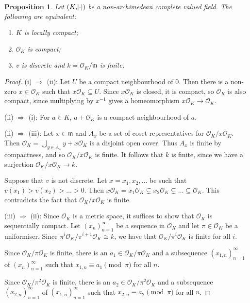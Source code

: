 \documentclass[11pt]{article}
\theoremstyle{definition}
\theoremstyle{plain}
\newtheorem{proposition}[definition]{Proposition}
\theoremstyle{remark}
\newcommand{\cO}{\mathcal{O}}
\newcommand{\fm}{\mathfrak{m}}
\begin{document}
\begin{proposition}\label{prop:7_2}
    Let $(K, \abs{\cdot})$ be a non-archimedean complete valued field. The following are equivalent:
    \begin{enumerate}
        \item $K$ is locally compact;
        \item $\cO_K$ is compact;
        \item $v$ is discrete and $k = \cO_K / \fm$ is finite.
    \end{enumerate}
\end{proposition}
\begin{proof}
    (i) $\Rightarrow$ (ii): Let $U$ be a compact neighbourhood of $0$. Then there is a non-zero $x \in \cO_K$ such that $x \cO_K \subseteq U$. Since $x \cO_K$ is closed, it is compact, so $\cO_K$ is also compact, since multiplying by $x^{-1}$ gives a homeomorphism $x \cO_K \to \cO_K$.

    \noindent (ii) $\Rightarrow$ (i): For $a \in K$, $a + \cO_K$ is a compact neighbourhood of $a$.

    \noindent (ii) $\Rightarrow$ (iii): Let $x \in \fm$ and $A_x$ be a set of coset representatives for $\cO_K / x \cO_K$. Then $\cO_K = \bigcup_{y \in A_x} y + x \cO_K$ is a disjoint open cover. Thus $A_x$ is finite by compactness, and so $\cO_K / x \cO_K$ is finite. It follows that $k$ is finite, since we have a surjection $\cO_K / x \cO_K \to k$.

    Suppose that $v$ is not discrete. Let $x = x_1, x_2, \ldots$ be such that $v(x_1) > v(x_2) > \ldots > 0$. Then $x \cO_K = x_1 \cO_K \subsetneq x_2 \cO_K \subsetneq \ldots \subseteq \cO_K$. This contradicts the fact that $\cO_K / x \cO_K$ is finite.

    \noindent (iii) $\Rightarrow$ (ii): Since $\cO_K$ is a metric space, it suffices to show that $\cO_K$ is sequentially compact. Let $(x_n)_{n=1}^\infty$ be a sequence in $\cO_K$ and let $\pi \in \cO_K$ be a uniformiser. Since $\pi^i \cO_K / \pi^{i+1} \cO_K \cong k$, we have that $\cO_K / \pi^i \cO_K$ is finite for all $i$.

    Since $\cO_K/\pi \cO_K$ is finite, there is an $a_1 \in \cO_K/\pi \cO_K$ and a subsequence $(x_{1,n})_{n=1}^\infty$ of $(x_n)_{n=1}^\infty$ such that $x_{1,n} \equiv a_1 \pmod{\pi}$ for all $n$.

    Since $\cO_K/\pi^2 \cO_K$ is finite, there is an $a_2 \in \cO_K/\pi^2 \cO_K$ and a subsequence $(x_{2,n})_{n=1}^\infty$ of $(x_{1,n})_{n=1}^\infty$ such that $x_{2,n} \equiv a_2 \pmod{\pi}$ for all $n$.


\end{proof}
\end{document}
